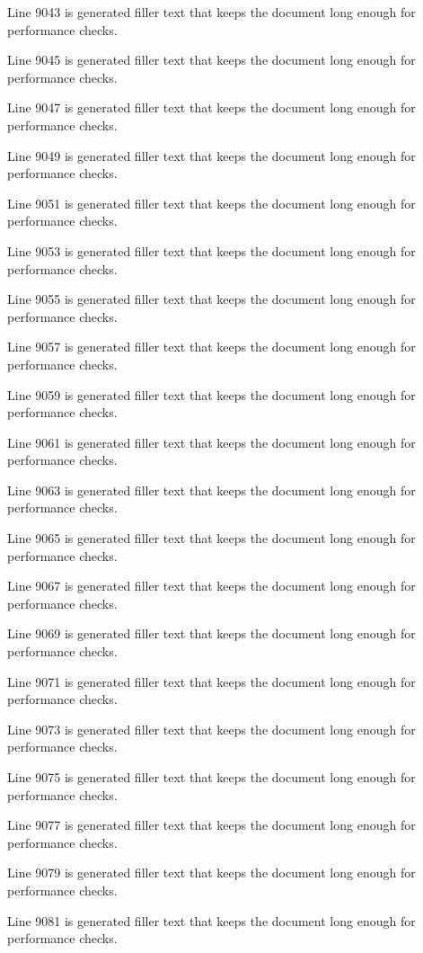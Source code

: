 Line 9043 is generated filler text that keeps the document long enough for performance checks.

Line 9045 is generated filler text that keeps the document long enough for performance checks.

Line 9047 is generated filler text that keeps the document long enough for performance checks.

Line 9049 is generated filler text that keeps the document long enough for performance checks.

Line 9051 is generated filler text that keeps the document long enough for performance checks.

Line 9053 is generated filler text that keeps the document long enough for performance checks.

Line 9055 is generated filler text that keeps the document long enough for performance checks.

Line 9057 is generated filler text that keeps the document long enough for performance checks.

Line 9059 is generated filler text that keeps the document long enough for performance checks.

Line 9061 is generated filler text that keeps the document long enough for performance checks.

Line 9063 is generated filler text that keeps the document long enough for performance checks.

Line 9065 is generated filler text that keeps the document long enough for performance checks.

Line 9067 is generated filler text that keeps the document long enough for performance checks.

Line 9069 is generated filler text that keeps the document long enough for performance checks.

Line 9071 is generated filler text that keeps the document long enough for performance checks.

Line 9073 is generated filler text that keeps the document long enough for performance checks.

Line 9075 is generated filler text that keeps the document long enough for performance checks.

Line 9077 is generated filler text that keeps the document long enough for performance checks.

Line 9079 is generated filler text that keeps the document long enough for performance checks.

Line 9081 is generated filler text that keeps the document long enough for performance checks.

